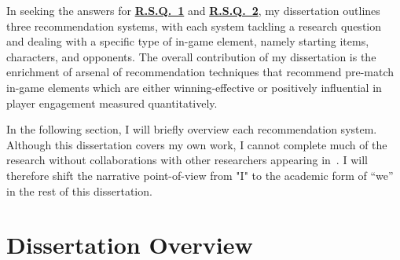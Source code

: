 


In seeking the answers for \hyperref[rq1]{\textbf{R.S.Q.~1}} and \hyperref[rq2]{\textbf{R.S.Q.~2}}, my dissertation outlines three recommendation systems, with each system tackling a research question and dealing with a specific type of in-game element, namely starting items, characters, and opponents. The overall contribution of my dissertation is the enrichment of arsenal of recommendation techniques that recommend  pre-match in-game elements which are either winning-effective or positively influential in player engagement measured quantitatively.

In the following section, I will briefly overview each recommendation system. Although this dissertation covers my own work, I cannot complete much of the research without collaborations with other researchers appearing in~\cite{chenqdeckrec,chen2018draft,chen2017eomm}. I will therefore shift the narrative point-of-view from "I" to the academic form of “we” in the rest of this dissertation.


\section{Dissertation Overview}\label{sec:thesis_overview}


